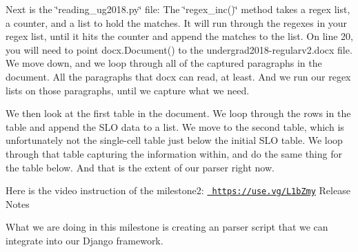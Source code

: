 Next is the \char`\"{}reading\+\_\+ug2018.\+py\char`\"{} file\+: The \char`\"{}regex\+\_\+inc()\char`\"{} method takes a regex list, a counter, and a list to hold the matches. It will run through the regexes in your regex list, until it hits the counter and append the matches to the list. On line 20, you will need to point docx.\+Document() to the undergrad2018-\/regularv2.\+docx file. We move down, and we loop through all of the captured paragraphs in the document. All the paragraphs that docx can read, at least. And we run our regex lists on those paragraphs, until we capture what we need.

We then look at the first table in the document. We loop through the rows in the table and append the SLO data to a list. We move to the second table, which is unfortunately not the single-\/cell table just below the initial SLO table. We loop through that table capturing the information within, and do the same thing for the table below. And that is the extent of our parser right now.

Here is the video instruction of the milestone2\+: \href{https://use.vg/L1bZmy}{\texttt{ https\+://use.\+vg/\+L1b\+Zmy}} Release Notes

What we are doing in this milestone is creating an parser script that we can integrate into our Django framework. 